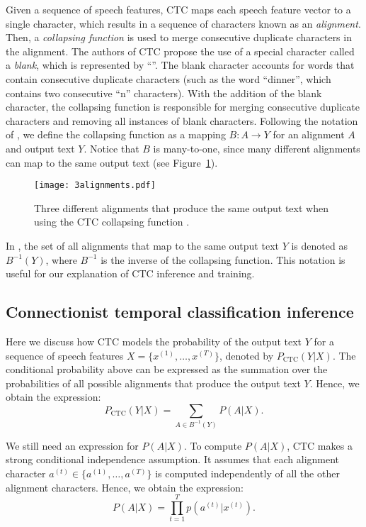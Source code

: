 Given a sequence of speech features, CTC maps each speech feature vector to a single character, which results in a sequence of characters known as an \emph{alignment}. 
Then, a \emph{collapsing function} is used to merge consecutive duplicate characters in the alignment.
The authors of CTC propose the use of a special character called a \emph{blank}, which is represented by ``\textvisiblespace''.
The blank character accounts for words that contain consecutive duplicate characters (such as the word ``dinner'', which contains two consecutive ``n'' characters).
With the addition of the blank character, the collapsing function is responsible for merging consecutive duplicate characters and removing all instances of blank characters.
Following the notation of \cite{jurafskyspeech}, we define the collapsing function as a mapping $B: A \rightarrow Y$ for an alignment $A$ and output text $Y$.
Notice that $B$ is many-to-one, since many different alignments can map to the same output text (see Figure~\ref{dinner}).

\begin{figure}[!ht]
    \centering
    
    \texttt{[image: 3alignments.pdf]}
    \caption{Three different alignments that produce the same output text when using the CTC collapsing function \cite{jurafskyspeech}.}
    \label{dinner}
\end{figure}

In \cite{jurafskyspeech}, the set of all alignments that map to the same output text $Y$ is denoted as $B^{-1}(Y)$, 
where $B^{-1}$ is the inverse of the collapsing function.
This notation is useful for our explanation of CTC inference and training.

\subsection{Connectionist temporal classification inference}
Here we discuss how CTC models the probability of the output text $Y$ 
for a sequence of speech features $X = \{x^{(1)}, \dots, x^{(T)}\}$, 
denoted by $P_{\text{CTC}}(Y|X)$.
The conditional probability above can be expressed as the summation over the probabilities
of all possible alignments that produce the output text $Y$. 
Hence, we obtain the expression: 
\begin{equation}
    P_{\text{CTC}}(Y|X) = \sum\limits_{A \in B^{-1}(Y)} P(A|X).
\end{equation}

We still need an expression for $P(A|X)$.
To compute $P(A|X)$, CTC makes a strong conditional independence assumption. 
It assumes that each alignment character $a^{(t)} \in \{a^{(1)}, \dots, a^{(T)}\}$ 
is computed independently of all the other alignment characters.
Hence, we obtain the expression:
\begin{equation}
    P(A|X) = \prod\limits_{t=1}^{T} p(a^{(t)} | x^{(t)}).
\end{equation}

